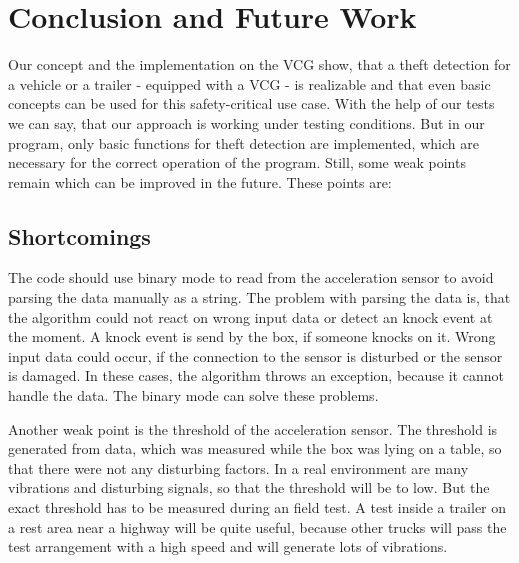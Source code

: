 \chapter{Conclusion and Future Work}

Our concept and the implementation on the VCG show, that a theft detection for a vehicle or a trailer - equipped with a VCG - is realizable and that even basic concepts can be used for this safety-critical use case. With the help of our tests we can say, that our approach is working under testing conditions. But in our program, only basic functions for theft detection are implemented, which are necessary for the correct operation of the program. Still, some weak points remain which can be improved in the future. These points are:


\section{Shortcomings}

The code should use binary mode to read from the acceleration sensor to avoid parsing the data manually as a string. The problem with parsing the data is, that the algorithm could not react on wrong input data or detect an knock event at the moment. A knock event is send by the box, if someone knocks on it. Wrong input data could occur, if the connection to the sensor is disturbed or the sensor is damaged. In these cases, the algorithm throws an exception, because it cannot handle the data. The binary mode can solve these problems.

Another weak point is the threshold of the acceleration sensor. The threshold is generated from data, which was measured while the box was lying on a table, so that there were not any disturbing factors. In a real environment are many vibrations and disturbing signals, so that the threshold will be to low. But the exact threshold has to be measured during an field test. A test inside a trailer on a rest area near a highway will be quite useful, because other trucks will pass the test arrangement with a high speed and will generate lots of vibrations.

